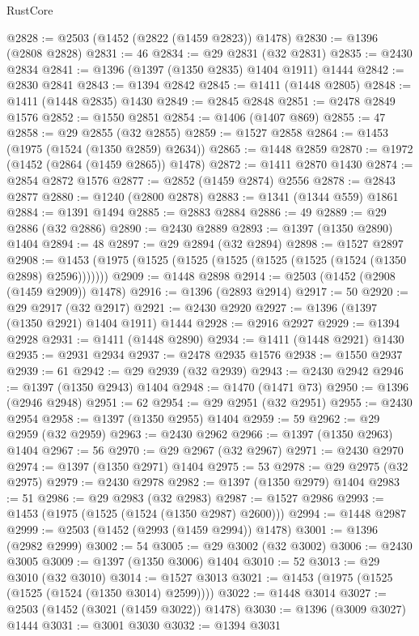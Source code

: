 \begin{lexlean}{RustCore}
\begin{coremodule}
@2828 := @2503 (@1452 (@2822 (@1459 @2823)) @1478)
@2830 := @1396 (@2808 @2828)
@2831 := 46
@2834 := @29 @2831 (@32 @2831)
@2835 := @2430 @2834
@2841 := @1396 (@1397 (@1350 @2835) @1404 @1911) @1444
@2842 := @2830 @2841
@2843 := @1394 @2842
@2845 := @1411 (@1448 @2805)
@2848 := @1411 (@1448 @2835) @1430
@2849 := @2845 @2848
@2851 := @2478 @2849 @1576
@2852 := @1550 @2851
@2854 := @1406 (@1407 @869)
@2855 := 47
@2858 := @29 @2855 (@32 @2855)
@2859 := @1527 @2858
@2864 := @1453 (@1975 (@1524 (@1350 @2859) @2634))
@2865 := @1448 @2859
@2870 := @1972 (@1452 (@2864 (@1459 @2865)) @1478)
@2872 := @1411 @2870 @1430
@2874 := @2854 @2872 @1576
@2877 := @2852 (@1459 @2874) @2556
@2878 := @2843 @2877
@2880 := @1240 (@2800 @2878)
@2883 := @1341 (@1344 @559) @1861
@2884 := @1391 @1494
@2885 := @2883 @2884
@2886 := 49
@2889 := @29 @2886 (@32 @2886)
@2890 := @2430 @2889
@2893 := @1397 (@1350 @2890) @1404
@2894 := 48
@2897 := @29 @2894 (@32 @2894)
@2898 := @1527 @2897
@2908 := @1453 (@1975 (@1525 (@1525 (@1525 (@1525 (@1525 (@1524 (@1350 @2898) @2596)))))))
@2909 := @1448 @2898
@2914 := @2503 (@1452 (@2908 (@1459 @2909)) @1478)
@2916 := @1396 (@2893 @2914)
@2917 := 50
@2920 := @29 @2917 (@32 @2917)
@2921 := @2430 @2920
@2927 := @1396 (@1397 (@1350 @2921) @1404 @1911) @1444
@2928 := @2916 @2927
@2929 := @1394 @2928
@2931 := @1411 (@1448 @2890)
@2934 := @1411 (@1448 @2921) @1430
@2935 := @2931 @2934
@2937 := @2478 @2935 @1576
@2938 := @1550 @2937
@2939 := 61
@2942 := @29 @2939 (@32 @2939)
@2943 := @2430 @2942
@2946 := @1397 (@1350 @2943) @1404
@2948 := @1470 (@1471 @73)
@2950 := @1396 (@2946 @2948)
@2951 := 62
@2954 := @29 @2951 (@32 @2951)
@2955 := @2430 @2954
@2958 := @1397 (@1350 @2955) @1404
@2959 := 59
@2962 := @29 @2959 (@32 @2959)
@2963 := @2430 @2962
@2966 := @1397 (@1350 @2963) @1404
@2967 := 56
@2970 := @29 @2967 (@32 @2967)
@2971 := @2430 @2970
@2974 := @1397 (@1350 @2971) @1404
@2975 := 53
@2978 := @29 @2975 (@32 @2975)
@2979 := @2430 @2978
@2982 := @1397 (@1350 @2979) @1404
@2983 := 51
@2986 := @29 @2983 (@32 @2983)
@2987 := @1527 @2986
@2993 := @1453 (@1975 (@1525 (@1524 (@1350 @2987) @2600)))
@2994 := @1448 @2987
@2999 := @2503 (@1452 (@2993 (@1459 @2994)) @1478)
@3001 := @1396 (@2982 @2999)
@3002 := 54
@3005 := @29 @3002 (@32 @3002)
@3006 := @2430 @3005
@3009 := @1397 (@1350 @3006) @1404
@3010 := 52
@3013 := @29 @3010 (@32 @3010)
@3014 := @1527 @3013
@3021 := @1453 (@1975 (@1525 (@1525 (@1524 (@1350 @3014) @2599))))
@3022 := @1448 @3014
@3027 := @2503 (@1452 (@3021 (@1459 @3022)) @1478)
@3030 := @1396 (@3009 @3027) @1444
@3031 := @3001 @3030
@3032 := @1394 @3031

\end{coremodule}
\end{lexlean}
